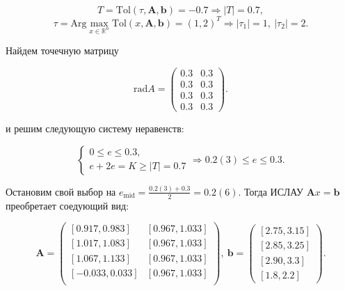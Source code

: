 \documentclass{article}
\begin{document}
  \begin{equation*}
    T = \text{Tol}(\tau, \mathbf{A}, \mathbf{b}) = -0.7 \Rightarrow |T| = 0.7,
  \end{equation*}
  \begin{equation*}
    \tau = \text{Arg} \max_{x \in \mathbb{R}^n}
    \text{Tol}(x, \mathbf{A}, \mathbf{b}) = (1, 2)^T \Rightarrow
    |\tau_1| = 1, \ |\tau_2| = 2.
  \end{equation*}

  Найдем точечную матрицу

  \begin{equation*}
    \text{rad} A = \begin{pmatrix}
      0.3 & 0.3 \\
      0.3 & 0.3 \\
      0.3 & 0.3 \\
      0.3 & 0.3
    \end{pmatrix}.
  \end{equation*}

  и решим следующую систему неравенств:

  \begin{equation*}
    \begin{cases}
      0 \leqslant e \leqslant 0.3, \\
      e + 2e = K \geqslant |T| = 0.7
    \end{cases} \Rightarrow 0.2(3) \leqslant e \leqslant 0.3.
  \end{equation*}

  Остановим свой выбор на
  \( e_{\text{mid}} = \frac{0.2(3) + 0.3}{2} = 0.2(6) \). Тогда ИСЛАУ
  \( \mathbf{A}x = \mathbf{b} \) преобретает соедующий вид:

  \begin{equation*}
    \mathbf{A} = \begin{pmatrix}
      [0.917, 0.983] & [0.967, 1.033] \\
      [1.017, 1.083] & [0.967, 1.033] \\
      [1.067, 1.133] & [0.967, 1.033] \\
      [-0.033, 0.033] & [0.967, 1.033] \\
    \end{pmatrix}, \
    \mathbf{b} = \begin{pmatrix}
      [2.75, 3.15] \\
      [2.85, 3.25] \\
      [2.90, 3.3] \\
      [1.8, 2.2]
    \end{pmatrix}.
  \end{equation*}
\end{document}
